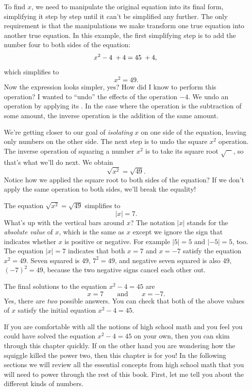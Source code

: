 	To find $x$,
	we need to manipulate the original equation into its final form,
	simplifying it step by step until it can't be simplified any further.
	The only requirement is that the manipulations we make transform one true equation into another true equation.
	In this example,
	the first simplifying step is to add the number four to both sides of the equation:
	\[
	 	x^2-4  \; + 4  	=	45    \; + 4, 	    \\
	\]
	which simplifies to
	\[
		x^2 	 		=	49.
	\]
	Now the expression looks simpler, yes?
	How did I know to perform this operation? 
	I wanted to ``undo'' the effects of the operation $-4$.
	We undo an operation by applying its .
	In the case where the operation is the subtraction of some amount,
	the inverse operation is the addition of the same amount.

	We're getting closer to our goal of \emph{isolating} $x$ on one side of the equation,							
	leaving only numbers on the other side.
	The next step is to undo the square $x^2$ operation.
	The inverse operation of squaring a number $x^2$ is to take its square root $\sqrt{\phantom{a}\; }$,
	so that's what we'll do next. We obtain
	\[ 
	   \sqrt{x^2} 		= 	\sqrt{49}.
	\]
	Notice how we applied the square root  to both sides of the equation? 
	If we don't apply the same operation to both sides, we'll break the equality!

	The equation $\sqrt{x^2}= \sqrt{49}$ simplifies to 
	\[
	 	|x|	= 	7.
	 \]
	What's up with the vertical bars around $x$?
	The notation $|x|$ stands for the \emph{absolute value} of $x$,											
	which is the same as $x$ except we ignore the sign that indicates whether $x$ is positive or negative. 
	For example $|5|=5$ and $|-5|=5$, too.
	The equation $|x|=7$ indicates that both $x=7$ and $x=-7$ satisfy the equation $x^2 = 49$.
	Seven squared is 49, $7^2=49$, and negative seven squared is also 49, $(-7)^2 = 49$,
	because the two negative signs cancel each other out.

	The final solutions to the equation $x^2-4=45$ are													
	\[
	 x  = 7 \qquad \textrm{and} \qquad   x=  - 7.
	\]
	Yes, there are \emph{two} possible answers. 
	You can check that both of the above values of $x$ satisfy the initial equation $x^2-4=45$.

	\bigskip

	If you are comfortable with all the notions of high school math
	and you feel you could have solved the equation $x^2-4=45$ on your own,		%
	then you can skim through this chapter quickly.
	If on the other hand you are wondering how the squiggle killed the power two,
	then this chapter is for you!
	In the following sections we will review all the essential concepts from
	high school math that you will need to power through the rest of this book.
	First, let me tell you about the different kinds of numbers.


